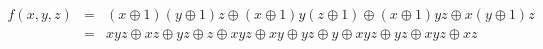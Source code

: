 \begin{eqnarray*}
    f(x,y,z) &=& (x \oplus 1)(y \oplus 1)z \oplus
                (x \oplus 1)y(z \oplus 1) \oplus
                (x \oplus 1)yz \oplus
                x(y \oplus 1)z \\
    &=& xyz \oplus xz \oplus yz \oplus z \oplus
                xyz \oplus xy \oplus yz \oplus y \oplus
                xyz \oplus yz \oplus
                xyz \oplus xz
\end{eqnarray*}